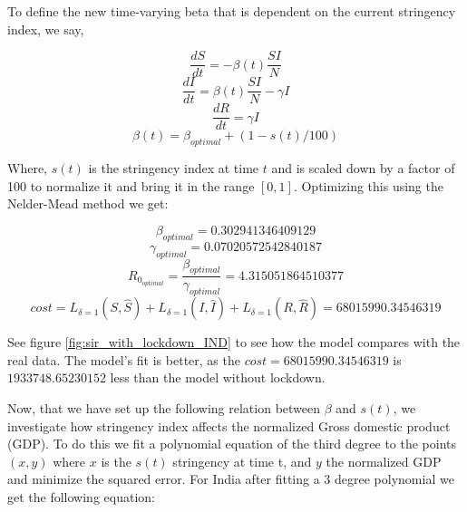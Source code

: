 \documentclass[tikz,fleqn,12pt]{wlscirep}
\begin{document}
To define the new time-varying beta that is dependent on the current stringency index, we say, 

\begin{equation}
  \frac{dS}{dt} = -\beta(t) \frac{S I}{N}
  \label{eq:S_with_lockdown}
\end{equation}
\begin{equation}
  \frac{dI}{dt} = \beta(t) \frac{S I}{N} - \gamma I
  \label{eq:I_with_lockdown}
\end{equation}
\begin{equation}
  \frac{dR}{dt} = \gamma I
  \label{eq:R_with_lockdown}
\end{equation}
\begin{equation}
  \beta(t) = \beta_{optimal} + (1 - s(t)/100)
  \label{eq:beta_time_varying_and_stringency_dependent}
\end{equation}

Where, $s(t)$ is the stringency index at time $t$ and is scaled down by a factor of 100 to normalize it and bring it in the range $[0, 1]$. Optimizing this using the Nelder-Mead method we get:

\begin{equation}
  \beta_{optimal} = 0.302941346409129
  \label{eq:beta_optimal_with_lockdown}
\end{equation}
\begin{equation}
  \gamma_{optimal} = 0.07020572542840187
  \label{eq:gamma_optimal_with_lockdown}
\end{equation}
\begin{equation}
  R_{0_{optimal}} = \frac{\beta_{optimal}}{\gamma_{optimal}} = 4.315051864510377
  \label{eq:r0_with_lockdown}
\end{equation}
\begin{equation}
  cost = L_{\delta = 1}(S, \hat{S}) + L_{\delta = 1}(I, \hat{I}) + L_{\delta = 1}(R, \hat{R}) = 68015990.34546319
  \label{eq:cost_with_lockdown}
\end{equation}

See figure \ref{fig:sir_with_lockdown_IND} to see how the model compares with the real data. The model's fit is better, as the $cost = 68015990.34546319$ is $1933748.65230152$ less than the model without lockdown.

Now, that we have set up the following relation between $\beta$ and $s(t)$, we investigate how stringency index affects the normalized Gross domestic product (GDP). To do this we fit a polynomial equation of the third degree to the points $(x, y)$ where $x$ is the $s(t)$ stringency at time t, and $y$ the normalized GDP and minimize the squared error. For India after fitting a 3 degree polynomial we get the following equation:
\end{document}
